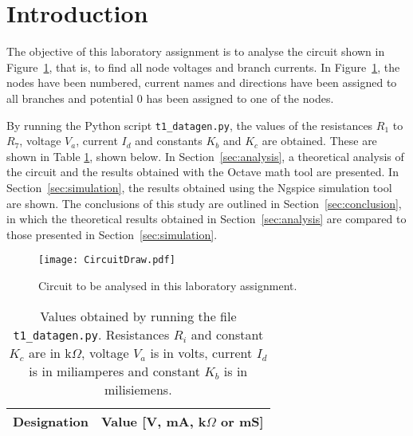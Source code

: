 \section{Introduction}
\label{sec:introduction}

The objective of this laboratory assignment is to analyse the circuit shown in Figure~\ref{fig:CircuitDraw}, that is, to find all node voltages and branch currents. In Figure~\ref{fig:CircuitDraw}, the nodes have been numbered, current names and directions have been assigned to all branches and potential $0$ has been assigned to one of the nodes.
\par
By running the Python script \texttt{t1\_datagen.py}, the values of the resistances $R_1$ to $R_7$, voltage $V_a$, current $I_d$ and constants $K_b$ and $K_c$ are obtained. These are shown in Table \ref{tab:GivenValues}, shown below. In Section~\ref{sec:analysis}, a theoretical analysis of the circuit and the results obtained with the Octave math tool are presented. In Section~\ref{sec:simulation}, the results obtained using the Ngspice simulation tool are shown. The conclusions of this study are outlined in Section~\ref{sec:conclusion}, in which the theoretical results obtained in Section~\ref{sec:analysis} are compared to those presented in Section~\ref{sec:simulation}.

\begin{figure}[H] \centering
  \texttt{[image: CircuitDraw.pdf]}
  \caption{Circuit to be analysed in this laboratory assignment.}
  \label{fig:CircuitDraw}
\end{figure}


\begin{table}[H]
  \centering
  \begin{tabular}{|c|c|}
    \hline    
    {\bf Designation} & {\bf Value [V, mA, k$\Omega$ or mS]} \\ \hline
    
  \end{tabular}
  \caption{Values obtained by running the file \texttt{t1\_datagen.py}. Resistances $R_i$ and constant $K_c$ are in k$\Omega$, voltage $V_a$ is in volts, current $I_d$ is in miliamperes and constant $K_b$ is in milisiemens.}
  \label{tab:GivenValues}
\end{table}

